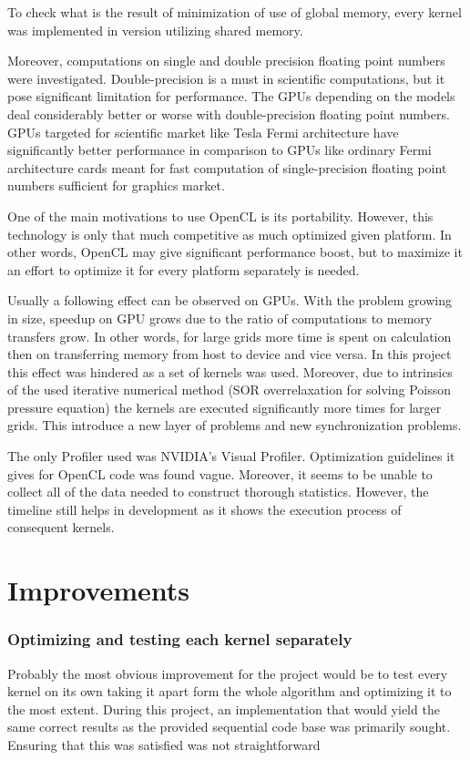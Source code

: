 To check what is the result of minimization of use of global memory, every kernel was implemented in version utilizing shared memory.

Moreover, computations on single and double precision floating point numbers were investigated. Double-precision is a must in scientific computations, but it pose significant limitation for performance. The GPUs depending on the models deal considerably better or worse with double-precision floating point numbers. GPUs targeted for scientific market like Tesla Fermi architecture have significantly better performance in comparison to GPUs like ordinary Fermi architecture cards meant for fast computation of single-precision floating point numbers sufficient for graphics market. 

One of the main motivations to use OpenCL is its portability. However, this technology is only that much competitive as much optimized given platform. In other words, OpenCL may give significant performance boost, but to maximize it an effort to optimize it for every platform separately is needed.

Usually a following effect can be observed on GPUs. With the problem growing in size, speedup on GPU grows due to the ratio of computations to memory transfers grow. In other words, for large grids more time is spent on calculation then on transferring memory from host to device and vice versa. In this project this effect was hindered as a set of kernels was used. Moreover, due to intrinsics of the used iterative numerical method (SOR overrelaxation for solving Poisson pressure equation) the kernels are executed significantly more times for larger grids.  This introduce a new layer of problems and new synchronization problems.

The only Profiler used was NVIDIA's Visual Profiler. Optimization guidelines it gives for OpenCL code was found vague. Moreover, it seems to be unable to collect all of the data needed to construct thorough statistics. However, the timeline still helps in development as it shows the execution process of consequent kernels.

\section{Improvements}
\subsubsection{Optimizing and testing each kernel separately}
Probably the most obvious improvement for the project would be to test every kernel on its own taking it apart form the whole algorithm and optimizing it to the most extent. During this project, an implementation that would yield the same correct results as the provided sequential code base was primarily sought. Ensuring that this was satisfied was not straightforward

